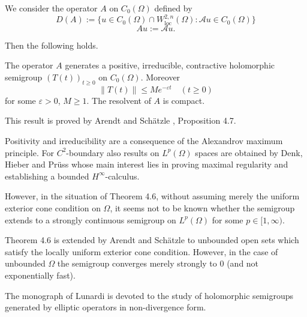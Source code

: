 We consider the operator $A$ on $C_0(\Omega)$ defined by
\[D(A) := \{u \in C_0(\Omega) \cap W^{2,n}_{\text{loc}}(\Omega) \colon \mathcal{A}u \in C_0(\Omega)\}\]
\[Au := \mathcal{A}u.\]

Then the following holds.

\begin{theorem}
The operator $A$ generates a positive, irreducible, contractive holomorphic semigroup $(T(t))_{t \geq 0}$ on $C_0(\Omega)$. Moreover
\[\|T(t)\| \leq Me^{-\varepsilon t} \quad (t \geq 0)\]
for some $\varepsilon > 0$, $M \geq 1$. The resolvent of $A$ is compact.
\end{theorem}
This result is proved by Arendt and Schätzle \cite{AS14}, Proposition 4.7. 

Positivity and irreducibility are a consequence of the Alexandrov maximum principle. For $C^2$-boundary also results on $L^p(\Omega)$ spaces are obtained by Denk, Hieber and Prüss \cite{DHP03} whose main interest lies in proving maximal regularity and establishing a bounded $H^\infty$-calculus.

However, in the situation of Theorem 4.6, without assuming merely the uniform exterior cone condition on $\Omega$, it seems not to be known whether the semigroup extends to a strongly continuous semigroup on $L^p(\Omega)$ for some $p \in [1,\infty)$.

Theorem 4.6 is extended by Arendt and Schätzle \cite{AS25} to unbounded open sets which satisfy the locally uniform exterior cone condition. However, in the case of unbounded $\Omega$ the semigroup converges merely strongly to $0$ (and not exponentially fast).

The monograph of Lunardi \cite{Lu95} is devoted to the study of holomorphic semigroups generated by elliptic operators in non-divergence form.
